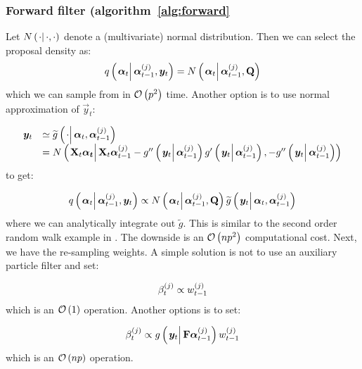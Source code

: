 \subsubsection*{Forward filter (algorithm~\ref{alg:forward}}
Let $\normalC{\cdot}{\cdot}{\cdot}$ denote a (multivariate) normal distribution. Then we can select the proposal density as:
\begin{equation}
	\IDC{\vec{\alpha}_t}{\partic{\vec{\alpha}}{t-1}{j}, \vec{y}_t} = %
		\normalC{\vec{\alpha}_t}{\partic{\vec{\alpha}}{t-1}{j}}{\mat{Q}}
\end{equation}%
%
which we can sample from in $\mathcal{O}\left( p^2\right)$ time. Another option is to use normal approximation of $\vec{y}_t$:

\begin{equation}\begin{array}{cl}
	\vec{y}_t & \simeq  \optorC{\widetilde{g}}{\cdot}{\vec{\alpha}_t, \partic{\vec{\alpha}}{t-1}{j}} \\ &= %
		\normalC{
			\mat{X}_t\vec{\vec{\alpha}_t}
		}{ %
			\mat{X}_t\partic{\vec{\alpha}}{t-1}{j} - 
			\optorC{g''}{\vec{y}_t}{\partic{\vec{\alpha}}{t-1}{j}}
			\optorC{g'}{\vec{y}_t}{\partic{\vec{\alpha}}{t-1}{j}}			
		}{ %
			- \optorC{g''}{\vec{y}_t}{\partic{\vec{\alpha}}{t-1}{j}}
		}
\end{array}\end{equation}
%
%
to get:

\begin{equation}
	\IDC{\vec{\alpha}_t}{\partic{\vec{\alpha}}{t-1}{j}, \vec{y}_t} \propto %
		\normalC{\vec{\alpha}_t}{\partic{\vec{\alpha}}{t-1}{j}}{\mat{Q}}
		\optorC{\widetilde{g}}{\vec{y}_t}{\vec{\alpha}_t, \partic{\vec{\alpha}}{t-1}{j}}
\end{equation}
%
where we can analytically integrate out $\widetilde{g}$. This is similar to the second order random walk example in \cite{fearnhead10}. The downside is an $\mathcal{O}\left( np^2\right)$ computational cost. Next, we have the re-sampling weights. A simple solution is not to use an auxiliary particle filter and set:

\begin{equation}
	\beta_{t}^{\left( j\right)} \propto w_{t-1}^{\left( j\right)}
\end{equation}
%
which is an $\mathcal{O}\left( 1\right)$ operation. Another options is to set:

\begin{equation}
	\partic{\beta}{t}{j} \propto  \optorC{g}{\vec{y}_t}{\mat{F}\partic{\vec{\alpha}}{t-1}{j}}\partic{w}{t-1}{j}
\end{equation}
%
%
which is an $\mathcal{O}\left( np\right)$ operation.

